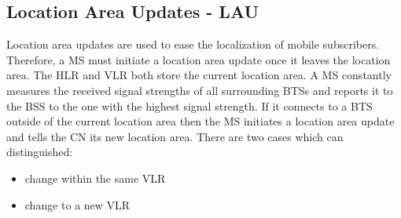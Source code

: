 \documentclass[master,english]{hgbthesis}
\begin{document}
\subsection{Location Area Updates - LAU}
Location area updates are used to ease the localization of mobile subscribers. Therefore, a MS must initiate a location area update once it leaves the location area. The HLR and VLR both store the current location area. A MS constantly measures the received signal strengths of all surrounding BTSs and reports it to the BSS to the one with the highest signal strength. If it connects to a BTS outside of the current location area then the MS initiates a location area update and tells the CN its new location area.
There are two cases which can distinguished:
\begin{itemize}
	\item change within the same VLR
	\item change to a new VLR
\end{itemize}
\end{document}
